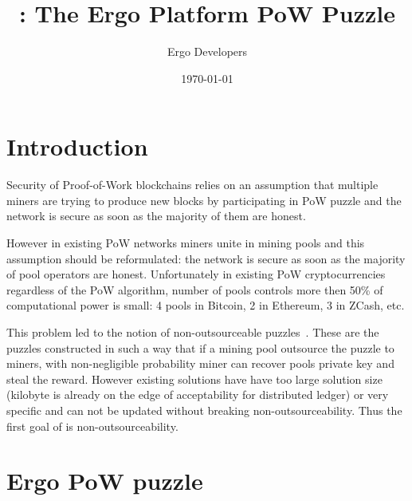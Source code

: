 \documentclass[]{article}
\begin{document}
    \title{\Name: The Ergo Platform PoW Puzzle}

    \author{Ergo Developers}

    \date{\today}
    \maketitle



    \section{Introduction}

    Security of Proof-of-Work blockchains relies on an assumption
    that multiple miners are trying to produce new blocks by
    participating in PoW puzzle and the network is secure as soon as the
    majority of them are honest.

    However in existing PoW networks miners unite in mining pools and
    this assumption should be reformulated: the network is secure as soon as the
    majority of pool operators are honest.
    Unfortunately in existing PoW cryptocurrencies
    regardless of the PoW algorithm, number of pools controls more then 50\% of
    computational power is small: 4 pools in Bitcoin, 2 in Ethereum, 3 in ZCash, etc.

    This problem led to the notion of non-outsourceable puzzles~\cite{miller2015nonoutsourceable,daian2017piecework}.
    These are the puzzles constructed in such a way that if a mining pool outsource the puzzle
    to miners, with non-negligible probability miner can recover pools private key and steal the reward.
    However existing solutions have have too large solution size (kilobyte is already
    on the edge of acceptability for distributed ledger) or very specific and
    can not be updated without breaking non-outsourceability. Thus the first goal of \Name is non-outsourceability.


    \section{Ergo PoW puzzle}
\end{document}
